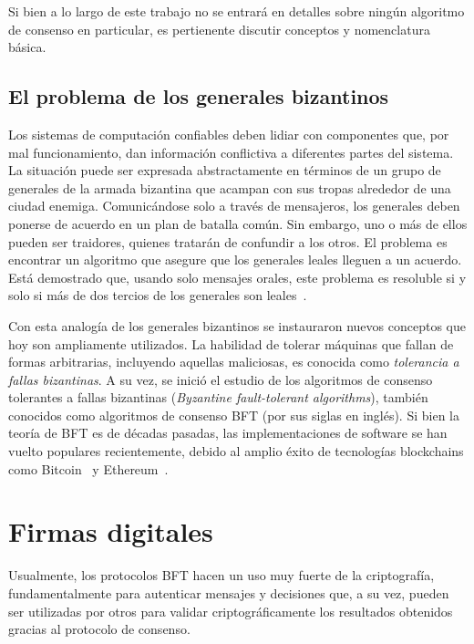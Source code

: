 %

Si bien a lo largo de este trabajo no se entrará en detalles sobre ningún algoritmo de consenso en particular,
es pertienente discutir conceptos y nomenclatura básica.

\subsection{El problema de los generales bizantinos}

Los sistemas de computación confiables deben lidiar con componentes que, por mal funcionamiento,
dan información conflictiva a diferentes partes del sistema.
La situación puede ser expresada abstractamente
en términos de un grupo de generales de la armada bizantina que acampan con sus tropas alrededor de una
ciudad enemiga.
Comunicándose solo a través de mensajeros, los generales deben ponerse de acuerdo en un plan
de batalla común.
Sin embargo, uno o más de ellos pueden ser traidores, quienes tratarán de confundir a los
otros.
El problema es encontrar un algoritmo que asegure que los generales leales lleguen a un acuerdo.
Está demostrado que, usando solo mensajes orales, este problema es resoluble si y solo si más de dos tercios
de los generales son leales~\cite{byzantineproblem}.

%

Con esta analogía de los generales bizantinos se instauraron nuevos conceptos que hoy son ampliamente utilizados.
La habilidad de tolerar máquinas que fallan de formas arbitrarias, incluyendo aquellas maliciosas,
es conocida como \emph{tolerancia a fallas bizantinas}.
A su vez, se inició el estudio de los algoritmos de consenso tolerantes a fallas
bizantinas (\textit{Byzantine fault-tolerant algorithms}), también conocidos como algoritmos de consenso BFT (por sus siglas en inglés).
Si bien la teoría de
BFT es de décadas pasadas, las implementaciones de software se han vuelto populares recientemente,
debido al amplio éxito de tecnologías blockchains como Bitcoin~\cite{nakamoto06bitcoin} y Ethereum~\cite{wood2014ethereum}.

\section{Firmas digitales}\label{subsec:signatures}
Usualmente, los protocolos BFT hacen un uso muy fuerte de la criptografía, fundamentalmente para autenticar
mensajes y decisiones que, a su vez, pueden ser utilizadas por otros para validar criptográficamente los resultados
obtenidos gracias al protocolo de consenso.

